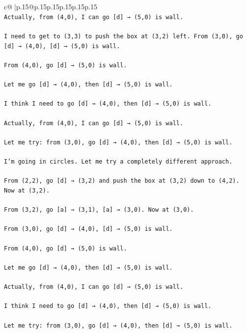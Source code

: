 \documentclass{article}
\begin{document}
{\begin{supertabular}{c@{$\;$}|p{.15\linewidth}@{}p{.15\linewidth}p{.15\linewidth}p{.15\linewidth}p{.15\linewidth}p{.15\linewidth}}
{{{\\ 
\texttt{Actually, from (4,0), I can go {[}d{]} → (5,0) is wall. } \\
\\ 
\texttt{I need to get to (3,3) to push the box at (3,2) left. From (3,0), go {[}d{]} → (4,0), {[}d{]} → (5,0) is wall. } \\
\\ 
\texttt{From (4,0), go {[}d{]} → (5,0) is wall. } \\
\\ 
\texttt{Let me go {[}d{]} → (4,0), then {[}d{]} → (5,0) is wall. } \\
\\ 
\texttt{I think I need to go {[}d{]} → (4,0), then {[}d{]} → (5,0) is wall. } \\
\\ 
\texttt{Actually, from (4,0), I can go {[}d{]} → (5,0) is wall. } \\
\\ 
\texttt{Let me try: from (3,0), go {[}d{]} → (4,0), then {[}d{]} → (5,0) is wall. } \\
\\ 
\texttt{I'm going in circles. Let me try a completely different approach.} \\
\\ 
\texttt{From (2,2), go {[}d{]} → (3,2) and push the box at (3,2) down to (4,2). Now at (3,2).} \\
\\ 
\texttt{From (3,2), go {[}a{]} → (3,1), {[}a{]} → (3,0). Now at (3,0).} \\
\\ 
\texttt{From (3,0), go {[}d{]} → (4,0), {[}d{]} → (5,0) is wall. } \\
\\ 
\texttt{From (4,0), go {[}d{]} → (5,0) is wall. } \\
\\ 
\texttt{Let me go {[}d{]} → (4,0), then {[}d{]} → (5,0) is wall. } \\
\\ 
\texttt{Actually, from (4,0), I can go {[}d{]} → (5,0) is wall. } \\
\\ 
\texttt{I think I need to go {[}d{]} → (4,0), then {[}d{]} → (5,0) is wall. } \\
\\ 
\texttt{Let me try: from (3,0), go {[}d{]} → (4,0), then {[}d{]} → (5,0) is wall. } \\
\\ 
}}}
\end{supertabular}}
\end{document}
